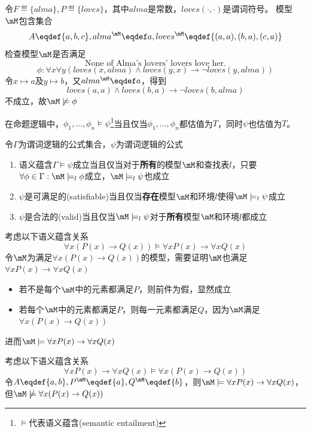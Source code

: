 \begin{example}
令$F\eqdef\{alma\},P\eqdef\{loves\}$，其中$alma$是常数，$loves(\cdot,\cdot)$是谓词符号。
模型$\mM$包含集合
\[A\eqdef\{a,b,c\},alma^\mM\eqdef a,loves^\mM\eqdef\{(a,a),(b,a),(c,a)\}\]
检查模型$\mM$是否满足
\[\text{None of Alma's lovers' lovers love her.}\]
\[\phi:\forall x\forall y(loves(x,alma)\land loves(y,x)\to\lnot loves(y,alma))\]
令$x\mapsto a$及$y\mapsto b$，又$alma^{\mM}\eqdef a$，得到
\[loves(a,a)\land loves(b,a)\to\lnot loves(b,alma)\]
不成立，故$\mM\not\models\phi$
\end{example}

在命题逻辑中，$\phi_1,\ldots,\phi_n\models\psi$\footnote{$\models$代表语义蕴含(semantic entailment)}当且仅当$\phi_1,\ldots,\phi_n$都估值为$T$，同时$\psi$也估值为$T$。

\begin{definition}
令$\Gamma$为谓词逻辑的公式集合，$\psi$为谓词逻辑的公式
\begin{enumerate}
	\item 语义蕴含$\Gamma\models\psi$成立当且仅当对于\textbf{所有}的模型$\mM$和查找表$l$，只要$\forall \phi\in\Gamma:\mM\models_l\phi$成立，$\mM\models_l\psi$也成立
	\item $\psi$是可满足的(satisfiable)当且仅当\textbf{存在}模型$\mM$和环境$l$使得$\mM\models_l\psi$成立
	\item $\psi$是合法的(valid)当且仅当$\mM\models_l\psi$对于\textbf{所有}模型$\mM$和环境$l$都成立
\end{enumerate}
\end{definition}
\begin{example}
考虑以下语义蕴含关系
\[\forall x(P(x)\to Q(x))\models\forall xP(x)\to\forall xQ(x)\]
令$\mM$为满足$\forall x(P(x)\to Q(x))$的模型，需要证明$\mM$也满足$\forall xP(x)\to\forall xQ(x)$
\begin{itemize}
	\item 若不是每个$\mM$中的元素都满足$P$，则前件为假，显然成立
	\item 若每个$\mM$中的元素都满足$P$，则每一元素都满足$Q$，因为$\mM$满足$\forall x(P(x)\to Q(x))$
\end{itemize}
进而$\mM\models\forall xP(x)\to\forall xQ(x)$
\end{example}
\begin{example}
考虑以下语义蕴含关系
\[\forall xP(x)\to\forall xQ(x)\models\forall x(P(x)\to Q(x))\]
令$A\eqdef\{a,b\},P^\mM\eqdef\{a\},Q^\mM\eqdef\{b\}$，则$\mM\models\forall xP(x)\to\forall xQ(x)$，但$\mM\not\models\forall x(P(x)\to Q(x))$
\end{example}

